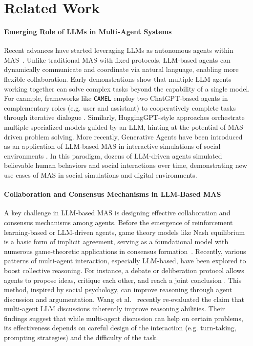 \section{Related Work}

\paragraph{Emerging Role of LLMs in Multi-Agent Systems} Recent advances have started leveraging LLMs as autonomous agents within MAS~\cite{chen-etal-2024-llmarena,islam-etal-2024-mapcoder,wang-etal-2024-rethinking-bounds}. Unlike traditional MAS with fixed protocols, LLM-based agents can dynamically communicate and coordinate via natural language, enabling more flexible collaboration. Early demonstrations show that multiple LLM agents working together can solve complex tasks beyond the capability of a single model. For example, frameworks like \texttt{CAMEL} employ two ChatGPT-based agents in complementary roles (e.g. user and assistant) to cooperatively complete tasks through iterative dialogue \cite{li2023camel}. Similarly, HuggingGPT-style approaches orchestrate multiple specialized models guided by an LLM, hinting at the potential of MAS-driven problem solving. More recently, Generative Agents have been introduced as an application of LLM-based MAS in interactive simulations of social environments \cite{gao2024large,huang2024social,park2023generative}. In this paradigm, dozens of LLM-driven agents simulated believable human behaviors and social interactions over time, demonstrating new use cases of MAS in social simulations and digital environments.

\paragraph{Collaboration and Consensus Mechanisms in LLM-Based MAS} A key challenge in LLM-based MAS is designing effective collaboration and consensus mechanisms among agents. Before the emergence of reinforcement learning-based or LLM-driven agents, game theory models like Nash equilibrium is a basic form of implicit agreement, serving as a foundational model with numerous game-theoretic applications in consensus formation~\cite{fujita2014approach,pramanik2021consensus,ye2017distributed}. Recently, various patterns of multi-agent interaction, especially LLM-based, have been explored to boost collective reasoning. For instance, a debate or deliberation protocol allows agents to propose ideas, critique each other, and reach a joint conclusion \cite{liu2024groupdebate,zhang-etal-2024-exploring}. This method, inspired by social psychology, can improve reasoning through agent discussion and argumentation. Wang et al.~\cite{wang-etal-2024-rethinking-bounds} recently re-evaluated the claim that multi-agent LLM discussions inherently improve reasoning abilities. Their findings suggest that while multi-agent discussion can help on certain problems, its effectiveness depends on careful design of the interaction (e.g. turn-taking, prompting strategies) and the difficulty of the task.

